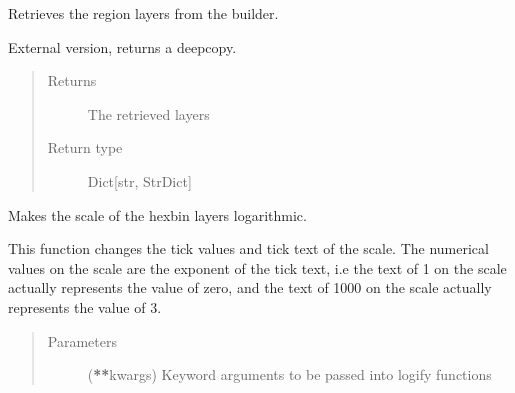 \documentclass[letterpaper,10pt,english]{sphinxmanual}
\begin{document}
\begin{fulllineitems}

\begin{fulllineitems}
\label{\detokenize{builder:geohexviz.builder.PlotBuilder.get_regions}}
\sphinxAtStartPar
Retrieves the region layers from the builder.

\sphinxAtStartPar
External version, returns a deepcopy.
\begin{quote}\begin{description}
\item[{Returns}] \leavevmode
\sphinxAtStartPar
The retrieved layers

\item[{Return type}] \leavevmode
\sphinxAtStartPar
Dict{[}str, StrDict{]}

\end{description}\end{quote}

\end{fulllineitems}


\begin{fulllineitems}
\label{\detokenize{builder:geohexviz.builder.PlotBuilder.logify_scale}}
\sphinxAtStartPar
Makes the scale of the hexbin layers logarithmic.

\sphinxAtStartPar
This function changes the tick values and tick text of the scale.
The numerical values on the scale are the exponent of the tick text,
i.e the text of 1 on the scale actually represents the value of zero,
and the text of 1000 on the scale actually represents the value of 3.
\begin{quote}\begin{description}
\item[{Parameters}] \leavevmode
\sphinxAtStartPar
{} ({\color{red}\bfseries{}**}kwargs) \textendash{} Keyword arguments to be passed into logify functions

\end{description}\end{quote}


\end{fulllineitems}
\end{fulllineitems}
\end{document}
